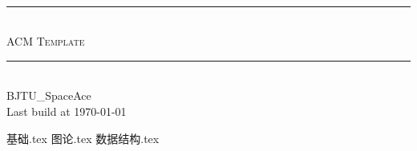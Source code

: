 ﻿\documentclass[12pt,a4paper]{article}
\begin{document}
    \pagestyle{fancy}
    \lhead{} 
    \chead{} 
    \cfoot{}
    \rfoot{\bfseries\thepage} 
    \renewcommand{\headrulewidth}{0.4pt} 
    \renewcommand{\footrulewidth}{0.4pt}
    \begin{titlepage}

	\pagestyle{empty}
	
        \begin{center}
        ~\\[160pt]
        
        \hrule\ \\[8pt]
        \fontsize{48pt}{\baselineskip}\selectfont  \textsc{ACM Template}\\[8pt]
        \hrule\ \\[340pt]

        \huge BJTU\_SpaceAce\\[8pt]
        \Large Last build at \today
        \end{center}
    \end{titlepage}

    \restoregeometry
	\tableofcontents
    \clearpage
	
     {基础.tex}
     {图论.tex}
	 {数据结构.tex}
		
	
	\clearpage
	
\end{document}
